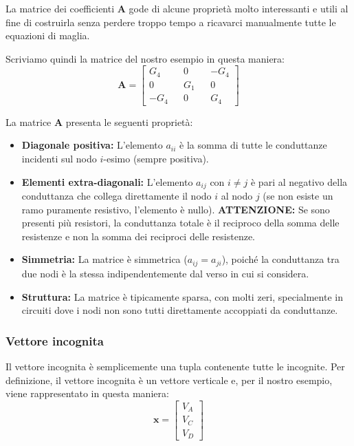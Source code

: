 La matrice dei coefficienti $\mathbf{A}$ gode di alcune proprietà molto interessanti e utili al fine di costruirla senza perdere troppo tempo a ricavarci manualmente tutte le equazioni di maglia.

Scriviamo quindi la matrice del nostro esempio in questa maniera:
\begin{equation}
    \mathbf{A} = 
    \begin{bmatrix}
        G_4 &  & 0        &  & -G_4       \\
        0   &  & G_1 &  & 0    \\
        - G_4     &  & 0        &  & G_4
    \end{bmatrix}
\end{equation}

La matrice $\mathbf{A}$ presenta le seguenti proprietà:
\begin{itemize}
\item \textbf{Diagonale positiva:} L'elemento $a_{ii}$ è la somma di tutte le conduttanze incidenti sul nodo $i$-esimo (sempre positiva).
\item \textbf{Elementi extra-diagonali:} L'elemento $a_{ij}$ con $i \neq j$ è pari al negativo della conduttanza che collega direttamente il nodo $i$ al nodo $j$ (se non esiste un ramo puramente resistivo, l'elemento è nullo).
\textbf{ATTENZIONE:} Se sono presenti più resistori, la conduttanza totale è il reciproco della somma delle resistenze e non la somma dei reciproci delle resistenze.
\item \textbf{Simmetria:} La matrice è simmetrica ($a_{ij}=a_{ji}$), poiché la conduttanza tra due nodi è la stessa indipendentemente dal verso in cui si considera.
\item \textbf{Struttura:} La matrice è tipicamente sparsa, con molti zeri, specialmente in circuiti dove i nodi non sono tutti direttamente accoppiati da conduttanze.
\end{itemize}

\subsubsection*{Vettore incognita}

Il vettore incognita è semplicemente una tupla contenente tutte le incognite. Per definizione, il vettore incognita è un vettore verticale e, per il nostro esempio, viene rappresentato in questa maniera:
\begin{equation}
    \mathbf{x} =
    \begin{bmatrix}
        V_A \\
        V_C \\
        V_D
    \end{bmatrix}
\end{equation}

